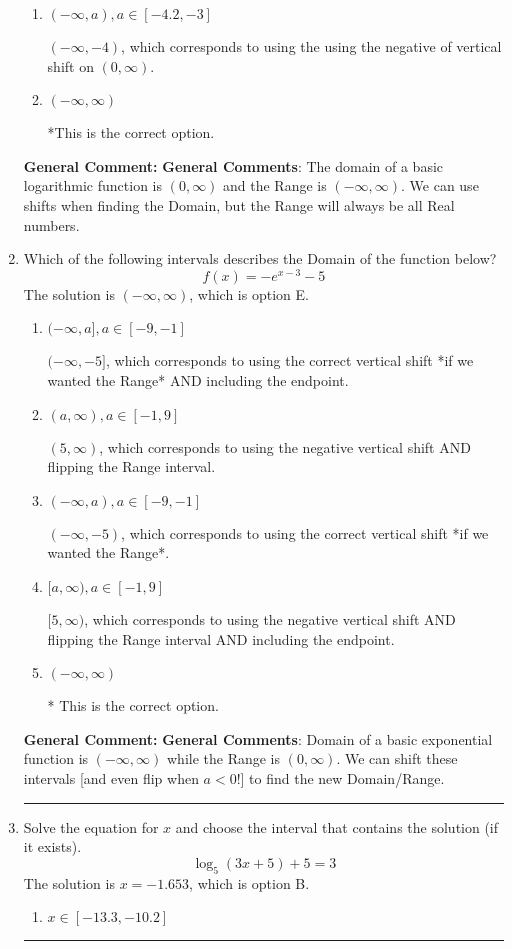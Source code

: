 \documentclass{extbook}[14pt]
\newcommand{\litem}[1]{\item #1

\rule{\textwidth}{0.4pt}}
\begin{document}
\begin{enumerate}
{\begin{enumerate}[label=\Alph*.]
$[4, \infty)$, which corresponds to using the flipped Domain AND including the endpoint.
\item \( (-\infty, a), a \in [-4.2, -3] \)

$(-\infty, -4)$, which corresponds to using the using the negative of vertical shift on $(0, \infty)$.
\item \( (-\infty, \infty) \)

*This is the correct option.
\end{enumerate}

\textbf{General Comment:} \textbf{General Comments}: The domain of a basic logarithmic function is $(0, \infty)$ and the Range is $(-\infty, \infty)$. We can use shifts when finding the Domain, but the Range will always be all Real numbers.
}
\litem{
Which of the following intervals describes the Domain of the function below?
\[ f(x) = -e^{x-3}-5 \]The solution is \( (-\infty, \infty) \), which is option E.\begin{enumerate}[label=\Alph*.]
\item \( (-\infty, a], a \in [-9, -1] \)

$(-\infty, -5]$, which corresponds to using the correct vertical shift *if we wanted the Range* AND including the endpoint.
\item \( (a, \infty), a \in [-1, 9] \)

$(5, \infty)$, which corresponds to using the negative vertical shift AND flipping the Range interval.
\item \( (-\infty, a), a \in [-9, -1] \)

$(-\infty, -5)$, which corresponds to using the correct vertical shift *if we wanted the Range*.
\item \( [a, \infty), a \in [-1, 9] \)

$[5, \infty)$, which corresponds to using the negative vertical shift AND flipping the Range interval AND including the endpoint.
\item \( (-\infty, \infty) \)

* This is the correct option.
\end{enumerate}

\textbf{General Comment:} \textbf{General Comments}: Domain of a basic exponential function is $(-\infty, \infty)$ while the Range is $(0, \infty)$. We can shift these intervals [and even flip when $a<0$!] to find the new Domain/Range.
}
\litem{
Solve the equation for $x$ and choose the interval that contains the solution (if it exists).
\[ \log_{5}{(3x+5)}+5 = 3 \]The solution is \( x = -1.653 \), which is option B.\begin{enumerate}[label=\Alph*.]
\item \( x \in [-13.3, -10.2] \)


\end{enumerate}}
\end{enumerate}
\end{document}

